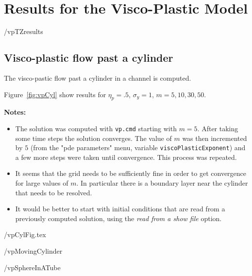 \section{Results for the Visco-Plastic Model}

\newcommand{\cDt}{{\rm cDt}}

 \vpDir/vpTZresults

\clearpage
\subsection{Visco-plastic flow past a cylinder}\label{sec:vpCyl}

The visco-pastic flow past a cylinder in a channel is computed. 

Figure~\ref{fig:vpCyl} show results for $\eta_p=.5$, $\sigma_y=1$, $m=5,10,30,50$.


{\bf Notes:} 
\begin{itemize}
\item The solution was computed with {\tt vp.cmd} starting with $m=5$. After taking 
some time steps the solution converges. The value of $m$ was then incremented by $5$ (from the "pde parameters" menu,
variable {\tt viscoPlasticExponent}) and a few more steps were taken until convergence. This process was repeated.

\item It seems that the grid needs to be sufficiently fine in order to get convergence for large values of $m$. In particular there
      is a boundary layer near the cylinder that needs to be resolved. 

\item It would be better to start with initial conditions that are read from a previously computed solution, using
      the {\em read from a show file} option.

\end{itemize}

 \vpDir/vpCylFig.tex




 \vpDir/vpMovingCylinder


 \vpDir/vpSphereInATube
